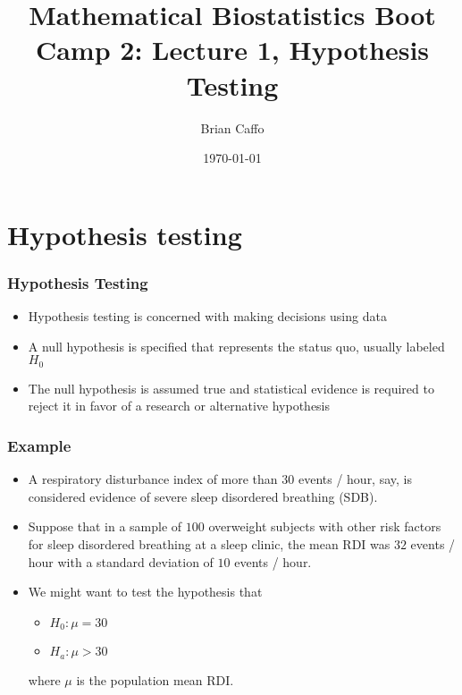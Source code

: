 \documentclass[aspectratio=169]{beamer}
\title{Mathematical Biostatistics Boot Camp 2: Lecture 1, Hypothesis Testing}
\author{Brian Caffo}
\date{\today}
\institute[Department of Biostatistics]{
  Department of Biostatistics \\
  Johns Hopkins Bloomberg School of Public Health\\
  Johns Hopkins University
}
\begin{document}
\frame{\titlepage}



\section{Hypothesis testing}
\begin{frame}\frametitle{Hypothesis Testing}
\begin{itemize}
\item Hypothesis testing is concerned with making decisions using data
\item A null hypothesis is specified that represents the status quo,
  usually labeled $H_0$
\item The null hypothesis is assumed true and statistical evidence is required
  to reject it in favor of a research or alternative hypothesis 
\end{itemize}
\end{frame}

\begin{frame}\frametitle{Example}
\begin{itemize}
\item A respiratory disturbance index of more than $30$ events / hour, say, is 
  considered evidence of severe sleep disordered breathing (SDB).
\item Suppose that in a sample of $100$ overweight subjects with other
  risk factors for sleep disordered breathing at a sleep clinic, the
  mean RDI was $32$ events / hour with a standard deviation of $10$ events / hour.
\item We might want to test the hypothesis that 
  \begin{itemize}
  \item $H_0 : \mu = 30$
  \item $H_a : \mu > 30$
  \end{itemize}
  where $\mu$ is the population mean RDI.
\end{itemize}
\end{frame}
\end{document}
